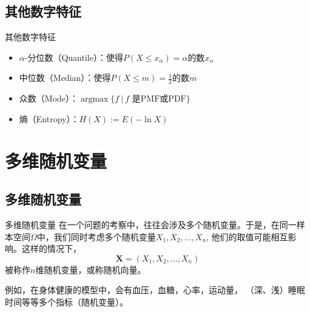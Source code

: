 
\subsection{其他数字特征}


\begin{frame}

\begin{block}{其他数字特征}
\begin{itemize}
\item $\alpha$-分位数（Quantile）：使得$P(X\le x_{\alpha}) = \alpha$的数$x_{\alpha}$
\item 中位数（Median）：使得$P(X\le m) = \frac{1}{2}$的数$m$
\item 众数（Mode）：$\operatorname{argmax} \{f \ |\ f\text{ 是PMF或PDF}\}$
\item 熵（Entropy）：$H(X) := E(-\ln X)$
\end{itemize}
\end{block}

\end{frame}


\section{多维随机变量}


\subsection{多维随机变量}


\begin{frame}

\begin{block}{多维随机变量}
在一个问题的考察中，往往会涉及多个随机变量。于是，在同一样本空间$\Omega$中，我们同时考虑多个随机变量$X_1,X_2,\ldots,X_n$, 他们的取值可能相互影响。这样的情况下，
\[\mathbf{X} = (X_1,X_2,\ldots,X_n)\]
被称作$n$维随机变量，或称随机向量。
\end{block}

\vspace{1em}

例如，在身体健康的模型中，会有血压，血糖，心率，运动量， （深、浅）睡眠时间等等多个指标（随机变量）。

\end{frame}

